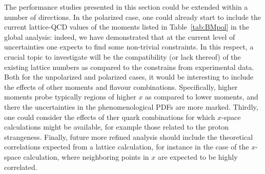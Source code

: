 The performance studies presented in this section could be extended within
a number of directions.
%
In the polarized case, one could already start to include the current lattice-QCD
values of the moments listed in Table~\ref{tab:BMpol} in the global analysis: indeed,
we have demonstrated that at the current level of uncertainties one expects
to find some non-trivial constraints.
%
In this respect, a crucial topic to investigate will be the compatibility (or lack thereof)
of the existing lattice numbers as compared to the constrains from experimental data.
%
Both for the unpolarized and polarized cases, it would be interesting to include the effects
of other moments and flavour combinations.
%
Specifically, higher moments probe typically regions of higher $x$ as compared
to lower moments, and there the uncertainties in the phenomenological PDFs are
more marked.
%
Thirdly, one could consider the effects of ther quark combinations for which $x$-space
calculations might be available, for example those related to the proton strangeness.
%
Finally, future more refined analysis should include the theoretical correlations
expected from a lattice calculation, for instance in the case of the $x$-space calculation,
where neighboring points in $x$ are expected to be highly correlated.





